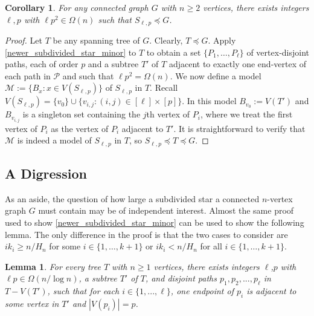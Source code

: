 \documentclass[12pt]{article}
\DeclarePairedDelimiter{\floor}{\lfloor}{\rfloor}
\renewcommand{\ge}{\geqslant}
\renewcommand{\le}{\leqslant}
\theoremstyle{plain}
\newtheorem{lem}[thm]{Lemma}
\newtheorem{cor}[thm]{Corollary}
\theoremstyle{definition}
\begin{document}
\begin{cor}\label{subdivided_star_minor_ii}
  For any connected graph $G$ with $n\ge 2$ vertices, there exists integers $\ell,p$ with $\ell p^2\in\Omega(n)$ such that $S_{\ell,p}\preceq G$.
\end{cor}

\begin{proof}
  Let $T$ be any spanning tree of $G$. Clearly, $T\preceq G$. Apply \cref{newer_subdivided_star_minor}
  to $T$ to obtain a set $\{P_1,\ldots,P_{\ell}\}$ of vertex-disjoint paths, each of order $p$ and a subtree $T'$ of $T$ adjacent to exactly one end-vertex of each path in $\mathcal{P}$ and such that $\ell p^2 =\Omega(n)$. We now define a model $\mathcal{M}:=\{B_x:x\in V(S_{\ell,p})\}$ of $S_{\ell,p}$ in $T$. Recall $V(S_{\ell,p})=\{v_0\}\cup \{v_{i,j}:(i,j)\in[\ell]\times[p]\}$. In this model $B_{v_0}:=V(T')$ and $B_{v_{i,j}}$ is a singleton set containing the $j$th vertex of $P_i$, where we treat the first vertex of $P_i$ as the vertex of $P_i$ adjacent to $T'$.  It is straightforward to verify that $\mathcal{M}$ is indeed a model of $S_{\ell,p}$ in $T$, so $S_{\ell,p}\preceq T\preceq G$.
\end{proof}

\subsection{A Digression}

As an aside, the question of how large a subdivided star a connected $n$-vertex graph $G$ must contain may be of independent interest.  Almost the same proof used to show \cref{newer_subdivided_star_minor} can be used to show the following lemma.  The only difference in the proof is that the two cases to consider are $i k_i\ge n/H_n$ for some $i\in\{1,\ldots,k+1\}$ or $i k_i < n/H_n$ for all $i\in\{1,\ldots,k+1\}$.

\begin{lem}\label{new_subdivided_star_minor}
    For every tree $T$ with $n \ge 1$ vertices, there exists integers $\ell$,$p$ with $\ell p \in \Omega(n/\log n)$, a subtree $T'$ of $T$, and disjoint paths $p_1, p_2, ..., p_\ell$ in $T - V(T')$, such that for each $i \in \{1,...,\ell\}$, one endpoint of $p_i$ is adjacent to some vertex in $T'$ and $|V(p_i)| = p$.
\end{lem} 

\end{document}
